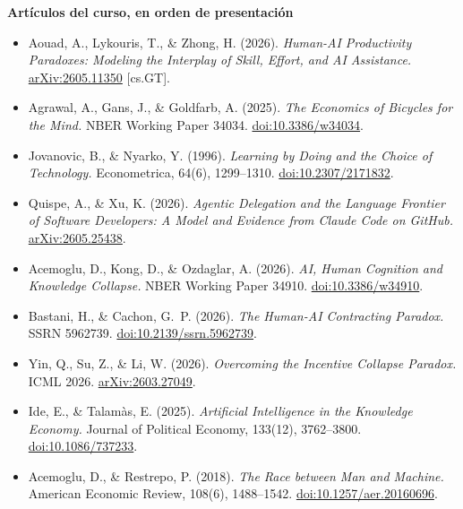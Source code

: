 \documentclass[11pt]{article}
\begin{document}
\textbf{Art\'iculos del curso, en orden de presentaci\'on}
\begin{itemize}
\item Aouad, A., Lykouris, T., \& Zhong, H. (2026). \emph{Human-AI Productivity Paradoxes: Modeling the Interplay of Skill, Effort, and AI Assistance.} \href{https://arxiv.org/abs/2605.11350}{arXiv:2605.11350} [cs.GT].
\item Agrawal, A., Gans, J., \& Goldfarb, A. (2025). \emph{The Economics of Bicycles for the Mind.} NBER Working Paper 34034. \href{https://doi.org/10.3386/w34034}{doi:10.3386/w34034}.
\item Jovanovic, B., \& Nyarko, Y. (1996). \emph{Learning by Doing and the Choice of Technology.} Econometrica, 64(6), 1299--1310. \href{https://doi.org/10.2307/2171832}{doi:10.2307/2171832}.
\item Quispe, A., \& Xu, K. (2026). \emph{Agentic Delegation and the Language Frontier of Software Developers: A Model and Evidence from Claude Code on GitHub.} \href{https://arxiv.org/abs/2605.25438}{arXiv:2605.25438}.
\item Acemoglu, D., Kong, D., \& Ozdaglar, A. (2026). \emph{AI, Human Cognition and Knowledge Collapse.} NBER Working Paper 34910. \href{https://doi.org/10.3386/w34910}{doi:10.3386/w34910}.
\item Bastani, H., \& Cachon, G.~P. (2026). \emph{The Human-AI Contracting Paradox.} SSRN 5962739. \href{https://doi.org/10.2139/ssrn.5962739}{doi:10.2139/ssrn.5962739}.
\item Yin, Q., Su, Z., \& Li, W. (2026). \emph{Overcoming the Incentive Collapse Paradox.} ICML 2026. \href{https://arxiv.org/abs/2603.27049}{arXiv:2603.27049}.
\item Ide, E., \& Talam\`as, E. (2025). \emph{Artificial Intelligence in the Knowledge Economy.} Journal of Political Economy, 133(12), 3762--3800. \href{https://doi.org/10.1086/737233}{doi:10.1086/737233}.
\item Acemoglu, D., \& Restrepo, P. (2018). \emph{The Race between Man and Machine.} American Economic Review, 108(6), 1488--1542. \href{https://doi.org/10.1257/aer.20160696}{doi:10.1257/aer.20160696}.
\end{itemize}
\end{document}
